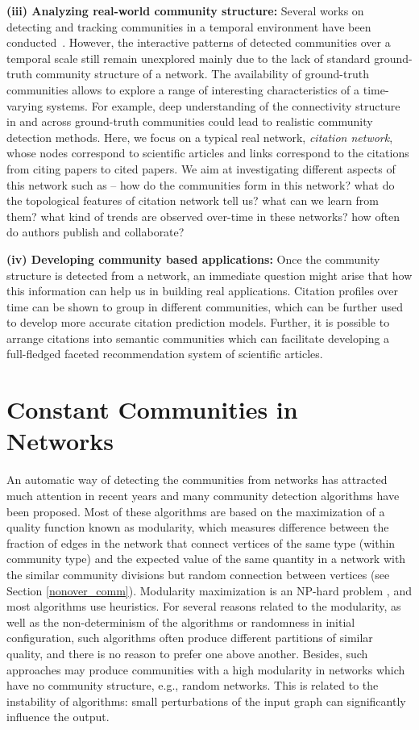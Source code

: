 {\bf (iii) Analyzing real-world community structure:}
Several works on detecting and tracking communities in a temporal environment have been conducted~\cite{Fortunato:2009}. However, the
interactive patterns of detected communities over a temporal scale still remain unexplored mainly due to the lack of standard
ground-truth community structure of a network. The availability of ground-truth communities allows to explore a range of interesting
characteristics of a time-varying systems. For example,
deep understanding of the connectivity structure in and across ground-truth communities could lead to realistic community detection
methods. Here, we focus on a typical real network, {\em citation network}, whose nodes correspond to
scientific
articles and links correspond to the citations from citing papers to cited papers. 
We aim at investigating different aspects of this network such as -- how do the communities form in this network? what do the topological
features of citation network tell us? what can we learn from them?  what kind of trends are observed over-time in these
networks? how often
do authors publish and collaborate? 

{\bf (iv) Developing community based applications:} 
Once the community structure is detected from a network, an immediate question might arise that how this information can help us in building
real applications. Citation profiles over time can be shown to group in different communities, which can be further used to develop more
accurate citation prediction models. Further, it is possible to arrange citations into semantic communities which can facilitate developing
a full-fledged faceted recommendation system of scientific articles.


\section{Constant Communities in Networks}
An automatic way of detecting the communities from networks has attracted much attention in recent years and many community detection
algorithms have been proposed. Most of these algorithms are based on the maximization of a quality function known as modularity,
which measures difference between the fraction of edges in the network that connect vertices of the same type (within community type) and
the expected value of the same quantity in a network with the similar community divisions but random connection between vertices
 (see Section \ref{nonover_comm}). Modularity maximization is an NP-hard problem \cite{Brandes}, and most algorithms use heuristics.
For several reasons related to the modularity, as well as the non-determinism of the algorithms or randomness in initial configuration, such
algorithms often produce different partitions of similar quality, and there is no reason to prefer one above another. Besides, such
approaches
may produce communities with a high modularity in networks which have no community structure, e.g., random networks. This is related to the
instability of algorithms: small perturbations of the input graph can significantly influence the output.

